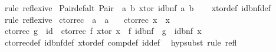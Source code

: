 \begin{isabellebody}
\ {\isacharparenleft}{\kern0pt}rule\ reflexive{\isacharparenright}{\kern0pt}%
\endisatagproof
{\isafoldproof}%
%
\isadelimproof
\isanewline
%
\endisadelimproof
\isanewline
{}\isamarkupfalse%
\ Pair{\isacharunderscore}{\kern0pt}def{\isacharunderscore}{\kern0pt}alt{\isacharcolon}{\kern0pt}\ {\isachardoublequoteopen}Pair\ {\isasymequiv}\ {\isacharparenleft}{\kern0pt}{\isasymlambda}a\ b{\isachardot}{\kern0pt}\ xtor\ {\isacharparenleft}{\kern0pt}id{\isacharunderscore}{\kern0pt}bnf\ {\isacharparenleft}{\kern0pt}a{\isacharcomma}{\kern0pt}\ b{\isacharparenright}{\kern0pt}{\isacharparenright}{\kern0pt}{\isacharparenright}{\kern0pt}{\isachardoublequoteclose}\isanewline
%
\isadelimproof
\ \ %
\endisadelimproof
%
\isatagproof
{}\isamarkupfalse%
\ xtor{\isacharunderscore}{\kern0pt}def\ id{\isacharunderscore}{\kern0pt}bnf{\isacharunderscore}{\kern0pt}def\ \isamarkupfalse%
\ {\isacharparenleft}{\kern0pt}rule\ reflexive{\isacharparenright}{\kern0pt}%
\endisatagproof
{\isafoldproof}%
%
\isadelimproof
\isanewline
%
\endisadelimproof
\isanewline
{}\isamarkupfalse%
\ ctor{\isacharunderscore}{\kern0pt}rec\ {\isacharcolon}{\kern0pt}{\isacharcolon}{\kern0pt}\ {\isachardoublequoteopen}{\isacharprime}{\kern0pt}a\ {\isasymRightarrow}\ {\isacharprime}{\kern0pt}a{\isachardoublequoteclose}\ \isanewline
\ \ {\isachardoublequoteopen}ctor{\isacharunderscore}{\kern0pt}rec\ x\ {\isacharequal}{\kern0pt}\ x{\isachardoublequoteclose}\isanewline
\isanewline
{}\isamarkupfalse%
\ ctor{\isacharunderscore}{\kern0pt}rec{\isacharcolon}{\kern0pt}\ {\isachardoublequoteopen}g\ {\isacharequal}{\kern0pt}\ id\ {\isasymLongrightarrow}\ ctor{\isacharunderscore}{\kern0pt}rec\ f\ {\isacharparenleft}{\kern0pt}xtor\ x{\isacharparenright}{\kern0pt}\ {\isacharequal}{\kern0pt}\ f\ {\isacharparenleft}{\kern0pt}{\isacharparenleft}{\kern0pt}id{\isacharunderscore}{\kern0pt}bnf\ {\isasymcirc}\ g\ {\isasymcirc}\ id{\isacharunderscore}{\kern0pt}bnf{\isacharparenright}{\kern0pt}\ x{\isacharparenright}{\kern0pt}{\isachardoublequoteclose}\isanewline
%
\isadelimproof
\ \ %
\endisadelimproof
%
\isatagproof
{}\isamarkupfalse%
\ ctor{\isacharunderscore}{\kern0pt}rec{\isacharunderscore}{\kern0pt}def\ id{\isacharunderscore}{\kern0pt}bnf{\isacharunderscore}{\kern0pt}def\ xtor{\isacharunderscore}{\kern0pt}def\ comp{\isacharunderscore}{\kern0pt}def\ id{\isacharunderscore}{\kern0pt}def\ \isamarkupfalse%
\ hypsubst\ {\isacharparenleft}{\kern0pt}rule\ refl{\isacharparenright}{\kern0pt}%
\endisatagproof

\end{isabellebody}
